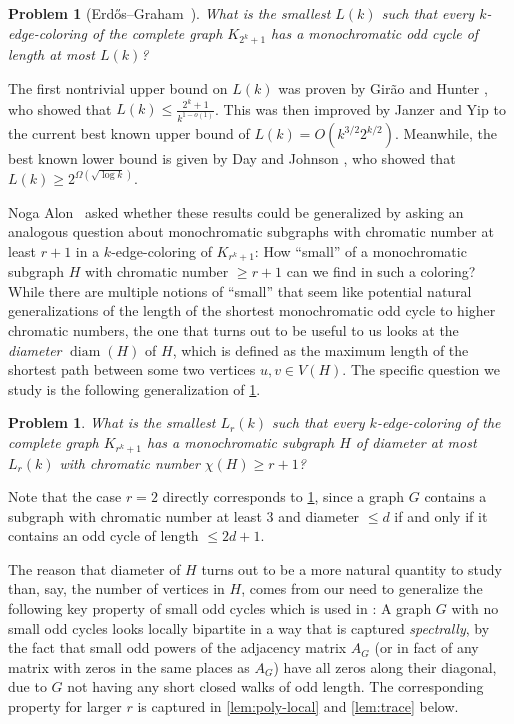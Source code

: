 \documentclass[10pt,a4paper]{amsart}
\newtheorem{problem}[theorem]{Problem}
\numberwithin{theorem}{section}
\renewcommand{\le}{\leqslant}
\renewcommand{\ge}{\geqslant}
\newcommand{\diam}{\operatorname{diam}}
\begin{document}
\begin{problem}[Erd\H{o}s--Graham~\cite{ErdosGraham1975PartitionTheorems}]\label{problem:odd-cycle}
    What is the smallest $L(k)$ such that every $k$-edge-coloring of the complete graph $K_{2^k+1}$ has a monochromatic odd cycle of length at most $L(k)$?
\end{problem}

The first nontrivial upper bound on $L(k)$ was proven by Gir\~ao and Hunter \cite{girão2024monochromaticoddcyclesedgecoloured}, who showed that $L(k)\le \frac{2^k+1}{k^{1-o(1)}}$. This was then improved by Janzer and Yip \cite{JanzerYip2026ShortMonochromaticOddCycles} to the current best known upper bound of $L(k)=O(k^{3/2}2^{k/2})$. Meanwhile, the best known lower bound is given by Day and Johnson \cite{DayJohnson2017MulticolourRamseyOddCycles}, who showed that $L(k)\ge 2^{\Omega(\sqrt{\log k})}$.

Noga Alon~\cite{Noga1} asked whether these results could be generalized by asking an analogous question about monochromatic subgraphs with chromatic number at least $r+1$ in a $k$-edge-coloring of $K_{r^k+1}$: How ``small'' of a monochromatic subgraph $H$ with chromatic number $\ge r+1$ can we find in such a coloring? While there are multiple notions of ``small'' that seem like potential natural generalizations of the length of the shortest monochromatic odd cycle to higher chromatic numbers, the one that turns out to be useful to us looks at the \emph{diameter} $\diam(H)$ of $H$, which is defined as the maximum length of the shortest path between some two vertices $u,v\in V(H)$. The specific question we study is the following generalization of \cref{problem:odd-cycle}.

\begin{problem}
    What is the smallest $L_r(k)$ such that every $k$-edge-coloring of the complete graph $K_{r^k+1}$ has a monochromatic subgraph $H$ of diameter at most $L_r(k)$ with chromatic number $\chi(H) \ge r+1$?
\end{problem}
Note that the case $r = 2$ directly corresponds to \cref{problem:odd-cycle}, since a graph $G$ contains a subgraph with chromatic number at least $3$ and diameter $\le d$ if and only if it contains an odd cycle of length $\le 2d+1$. 

The reason that diameter of $H$ turns out to be a more natural quantity to study than, say, the number of vertices in $H$, comes from our need to generalize the following key property of small odd cycles which is used in \cite{JanzerYip2026ShortMonochromaticOddCycles}: A graph $G$ with no small odd cycles looks locally bipartite in a way that is captured \emph{spectrally}, by the fact that small odd powers of the adjacency matrix $A_G$ (or in fact of any matrix with zeros in the same places as $A_G$) have all zeros along their diagonal, due to $G$ not having any short closed walks of odd length. The corresponding property for larger $r$ is captured in \cref{lem:poly-local} and \cref{lem:trace} below.
\end{document}
